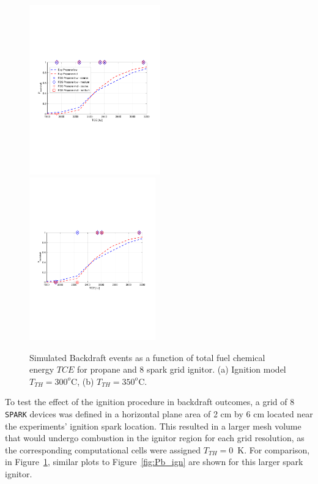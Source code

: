 \documentclass[12pt,letterpaper]{article}
\begin{document}
\begin{flushleft}
%
\begin{figure}[h]
    \centering
    \includegraphics[trim = 14.5mm 85mm 17mm 80mm, clip,width=0.505\textwidth]{PbvsTCE_Cign_LES_Extinction_2_TTH300_LGIGN_Propaneb.pdf}
    \includegraphics[trim = 22mm 85mm 17mm 80mm, clip,width=0.485\textwidth]{PbvsTCE_Cign_LES_Extinction_2_TTH350_LGIGN_Propaneb.pdf}
     \\
    \caption{Simulated Backdraft events as a function of total fuel chemical energy $TCE$ for propane and 8 spark grid ignitor. (a) Ignition model $T_{TH}=300^o$C, (b) $T_{TH}=350^o$C. }
    \label{fig:Pb_ignproc}
\end{figure}
%
To test the effect of the ignition procedure in backdraft outcomes, a grid of 8 \texttt{SPARK} devices was defined in a horizontal plane area of 2 cm by 6 cm located near the experiments' ignition spark location. This resulted in a larger mesh volume that would undergo combustion in the ignitor region for each grid resolution, as the corresponding computational cells were assigned $T_{TH}=0$~K. For comparison, in Figure~\ref{fig:Pb_ignproc}, similar plots to Figure~\ref{fig:Pb_ign} are shown for this larger spark ignitor.


\end{flushleft}
\end{document}
